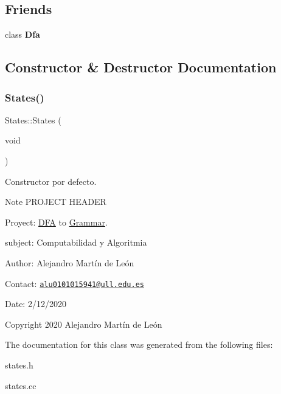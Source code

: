 \subsection*{Friends}
\begin{DoxyCompactItemize}
\item 
\mbox{\label{classStates_a21ab7f6ff9e8704242e18ecfde24a901}} 
class {\bfseries Dfa}
\end{DoxyCompactItemize}


\subsection{Constructor \& Destructor Documentation}
\mbox{\label{classStates_a8cf0b9ef14edb0704c74ac62ea338eab}} 
\subsubsection{\texorpdfstring{States()}{States()}}
{\footnotesize\ttfamily States\+::\+States (\begin{DoxyParamCaption}\item[{void}]{ }\end{DoxyParamCaption})}



Constructor por defecto. 

\begin{DoxyNote}{Note}
P\+R\+O\+J\+E\+CT H\+E\+A\+D\+ER 

Proyect\+: \hyperlink{classDFA}{D\+FA} to \hyperlink{classGrammar}{Grammar}. 

subject\+: Computabilidad y Algoritmia 

Author\+: Alejandro Martín de León 

Contact\+: \href{mailto:alu0101015941@ull.edu.es}{\tt alu0101015941@ull.\+edu.\+es} 

Date\+: 2/12/2020 

Copyright 2020 Alejandro Martín de León 
\end{DoxyNote}


The documentation for this class was generated from the following files\+:\begin{DoxyCompactItemize}
\item 
states.\+h\item 
states.\+cc\end{DoxyCompactItemize}
